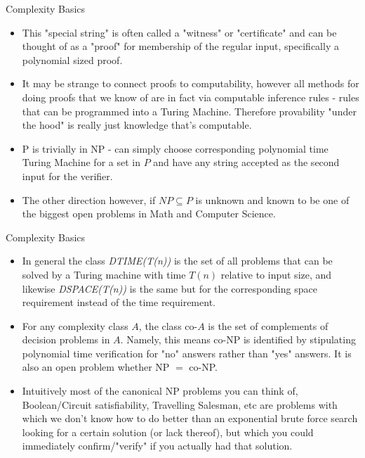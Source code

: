 \documentclass[aspectratio=169]{beamer}
\begin{document}
\begin{frame}{Complexity Basics}
  
  \begin{itemize}
    \item This "special string" is often called a "witness" or "certificate" and can be thought of as a "proof" for membership of the regular input, specifically a polynomial sized proof. \pause
    \item It may be strange to connect proofs to computability, however all methods for doing proofs that we know of are in fact via computable inference rules - rules that can be programmed into a Turing Machine. Therefore provability "under the hood" is really just knowledge that's computable. \pause
    \item P is trivially in NP - can simply choose corresponding polynomial time Turing Machine for a set in $P$ and have any string accepted as the second input for the verifier. \pause
    \item The other direction however, if $NP \subseteq P$ is unknown and known to be one of the biggest open problems in Math and Computer Science.
  \end{itemize}
\end{frame}


\begin{frame}{Complexity Basics}
  
  \begin{itemize}
    \item In general the class \emph{DTIME(T(n))} is the set of all problems that can be solved by a Turing machine with time $T(n)$ relative to input size, and likewise \emph{DSPACE(T(n))} is the same but for the corresponding space requirement instead of the time requirement. \pause
    \item For any complexity class $A$, the class co-$A$ is the set of complements of decision problems in $A$. Namely, this means co-NP is identified by stipulating polynomial time verification for "no" answers rather than "yes" answers. It is also an open problem whether NP $=$ co-NP. \pause
    \item Intuitively most of the canonical NP problems you can think of, Boolean/Circuit satisfiability, Travelling Salesman, etc are problems with which we don't know how to do better than an exponential brute force search looking for a certain solution (or lack thereof), but which you could immediately confirm/"verify" if you actually had that solution.
  \end{itemize}
\end{frame}
\end{document}
